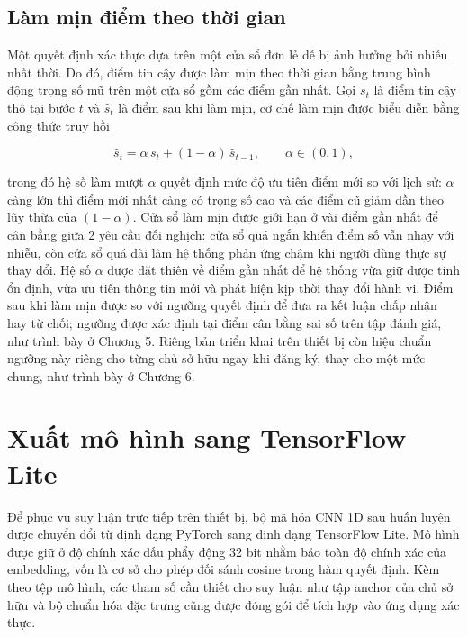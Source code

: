 \documentclass[../DoAn.tex]{subfiles}
\begin{document}
\subsection{Làm mịn điểm theo thời gian}

Một quyết định xác thực dựa trên một cửa sổ đơn lẻ dễ bị ảnh hưởng bởi nhiễu nhất thời. Do đó, điểm tin cậy được làm mịn theo thời gian bằng trung bình động trọng số mũ trên một cửa sổ gồm các điểm gần nhất. Gọi $s_t$ là điểm tin cậy thô tại bước $t$ và $\hat{s}_t$ là điểm sau khi làm mịn, cơ chế làm mịn được biểu diễn bằng công thức truy hồi

\begin{equation}
    \hat{s}_t = \alpha \, s_t + (1 - \alpha) \, \hat{s}_{t-1},
    \qquad \alpha \in (0, 1),
    \label{eq:ewma}
\end{equation}

trong đó hệ số làm mượt $\alpha$ quyết định mức độ ưu tiên điểm mới so với lịch sử: $\alpha$ càng lớn thì điểm mới nhất càng có trọng số cao và các điểm cũ giảm dần theo lũy thừa của $(1 - \alpha)$. Cửa sổ làm mịn được giới hạn ở vài điểm gần nhất để cân bằng giữa 2 yêu cầu đối nghịch: cửa sổ quá ngắn khiến điểm số vẫn nhạy với nhiễu, còn cửa sổ quá dài làm hệ thống phản ứng chậm khi người dùng thực sự thay đổi. Hệ số $\alpha$ được đặt thiên về điểm gần nhất để hệ thống vừa giữ được tính ổn định, vừa ưu tiên thông tin mới và phát hiện kịp thời thay đổi hành vi. Điểm sau khi làm mịn được so với ngưỡng quyết định để đưa ra kết luận chấp nhận hay từ chối; ngưỡng được xác định tại điểm cân bằng sai số trên tập đánh giá, như trình bày ở Chương 5. Riêng bản triển khai trên thiết bị còn hiệu chuẩn ngưỡng này riêng cho từng chủ sở hữu ngay khi đăng ký, thay cho một mức chung, như trình bày ở Chương 6.

\section{Xuất mô hình sang TensorFlow Lite}
\label{sec:export_tflite}

Để phục vụ suy luận trực tiếp trên thiết bị, bộ mã hóa CNN 1D sau huấn luyện được chuyển đổi từ định dạng PyTorch sang định dạng TensorFlow Lite. Mô hình được giữ ở độ chính xác dấu phẩy động 32 bit nhằm bảo toàn độ chính xác của embedding, vốn là cơ sở cho phép đối sánh cosine trong hàm quyết định. Kèm theo tệp mô hình, các tham số cần thiết cho suy luận như tập anchor của chủ sở hữu và bộ chuẩn hóa đặc trưng cũng được đóng gói để tích hợp vào ứng dụng xác thực.
\end{document}
